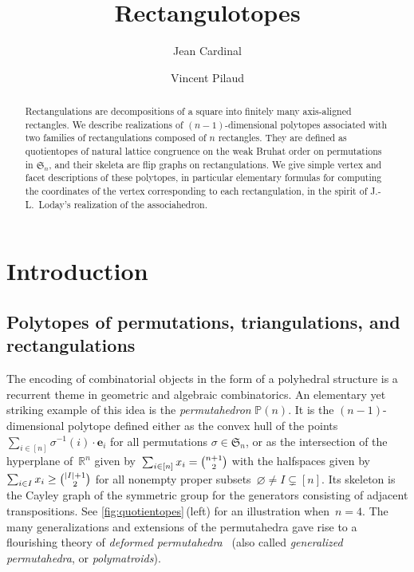 \documentclass{amsart}
\title{Rectangulotopes}
\author{Jean Cardinal}
\author{Vincent Pilaud}
\theoremstyle{definition}
\newcommand{\R}{\mathbb{R}} %
\renewcommand{\b}[1]{{\boldsymbol{#1}}} %
\newcommand{\f}[1]{\mathfrak{#1}} %
\newcommand{\darkblue}{\color{darkblue}} %
\newcommand{\defn}[1]{\textsl{\darkblue #1}} %
\newcommand{\polytope}[1]{\mathds{#1}} %
\newcommand{\Perm}{\polytope{P}} %
\begin{document}
\begin{abstract}
  Rectangulations are decompositions of a square into finitely many axis-aligned rectangles.
  We describe realizations of $(n-1)$-dimensional polytopes associated with two families of rectangulations composed of $n$ rectangles.
  They are defined as quotientopes of natural lattice congruence on the weak Bruhat order on permutations in $\f{S}_n$, and their skeleta are flip graphs on rectangulations.
  We give simple vertex and facet descriptions of these polytopes, in particular elementary formulas for computing the coordinates of the vertex corresponding to each rectangulation, in the spirit of J.-L.~Loday's realization of the associahedron.
\end{abstract}

\maketitle

\tableofcontents


\section{Introduction}
\label{sec:intro}


\subsection{Polytopes of permutations, triangulations, and rectangulations}
\label{subsec:permTrianRect}

The encoding of combinatorial objects in the form of a polyhedral structure is a recurrent theme in geometric and algebraic combinatorics.
An elementary yet striking example of this idea is the \defn{permutahedron} $\Perm (n)$.
It is the $(n-1)$-dimensional polytope defined either as the convex hull of the points $\sum_{i\in [n]} \sigma^{-1}(i)\cdot \b{e}_i$ for all permutations $\sigma \in \f{S}_n$, or as the intersection of the hyperplane of~$\R^n$ given by~$\sum_{i \in [n]} x_i = \smash{\binom{n+1}{2}}$ with the halfspaces given by~$\sum_{i \in I} x_i \ge \smash{\binom{|I|+1}{2}}$ for all nonempty proper subsets~$\varnothing \ne I \subsetneq [n]$.
Its skeleton is the Cayley graph of the symmetric group for the generators consisting of adjacent transpositions.
See \cref{fig:quotientopes}\,(left) for an illustration when~$n = 4$.
The many generalizations and extensions of the permutahedra gave rise to a flourishing theory of \defn{deformed permutahedra}~\cite{MR2520477,Postnikov,MR4064768,MR4651496} (also called \defn{generalized permutahedra}, or \defn{polymatroids}).
\end{document}
